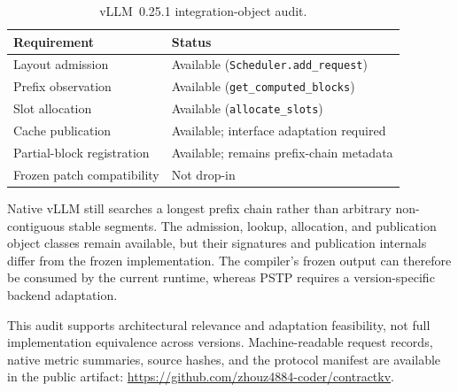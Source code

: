 \documentclass[journal]{IEEEtran}
\begin{document}
\begin{table}[H]
\centering
\caption{vLLM~0.25.1 integration-object audit.}
\label{tab:vllm025-hooks}
\scriptsize
\setlength{\tabcolsep}{3pt}
\begin{tabular}{p{}p{}}
\toprule
Requirement & Status \\
\midrule
Layout admission & Available (\texttt{Scheduler.add\_request}) \\
Prefix observation & Available (\texttt{get\_computed\_blocks}) \\
Slot allocation & Available (\texttt{allocate\_slots}) \\
Cache publication & Available; interface adaptation required \\
Partial-block registration & Available; remains prefix-chain metadata \\
Frozen patch compatibility & Not drop-in \\
\bottomrule
\end{tabular}
\end{table}

Native vLLM still searches a longest prefix chain rather than arbitrary
non-contiguous stable segments. The admission, lookup, allocation, and
publication object classes remain available, but their signatures and
publication internals differ from the frozen implementation. The compiler's
frozen output can therefore be consumed by the current runtime, whereas PSTP
requires a version-specific backend adaptation.

This audit supports architectural relevance and adaptation feasibility, not
full implementation equivalence across versions. Machine-readable request
records, native metric summaries, source hashes, and the protocol manifest are
available in the public artifact:
\url{https://github.com/zhouz4884-coder/contractkv}.
\end{document}
